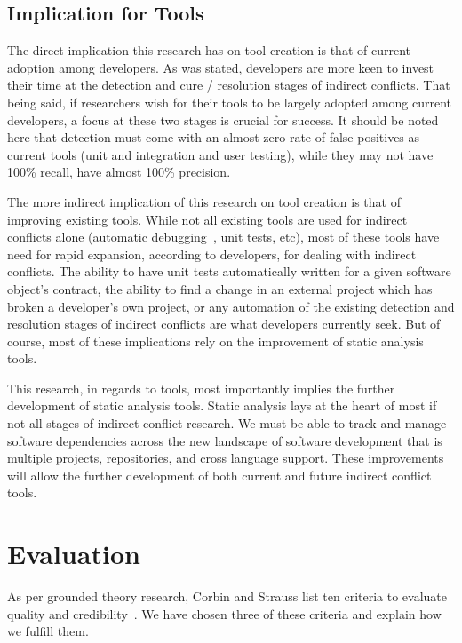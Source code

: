 \documentclass[conference]{IEEEtran}
\begin{document}
\subsection{Implication for Tools}
\label{sec:implt}

The direct implication this research has on tool creation is that of current adoption among developers. As was stated,
developers are more keen to invest their time at the detection and cure / resolution stages of indirect conflicts. That being 
said, if researchers wish for their tools to be largely adopted among current developers, a focus at these two stages
is crucial for success. It should be noted here that detection must come with an almost zero rate of false positives as
current tools (unit and integration and user testing), while they may not have 100\% recall, have almost 100\% precision.

The more indirect implication of this research on tool creation is that of improving existing tools. While not all existing
tools are used for indirect conflicts alone (automatic debugging~\cite{Zeller:2005:WPF}, unit tests, etc), most of these tools
have need for rapid expansion, according to developers, for dealing with indirect conflicts. The ability to have unit tests
automatically written for a given software object's contract, the ability to find a change  in an external project
which has broken a developer's own project, or any automation of the existing detection and resolution stages of indirect
conflicts are what developers currently seek. But of course, most of these implications rely on the improvement of 
static analysis tools.

This research, in regards to tools, most importantly implies the further development of static analysis tools. Static 
analysis lays at the heart of most if not all stages of indirect conflict research. We must be able to track and manage
software dependencies across the new landscape of software development that is multiple projects, repositories, and cross
language support. These improvements will allow the further development of both current and future indirect conflict
tools.

\section{Evaluation}
\label{sec:eval}

As per grounded theory research, Corbin and Strauss list ten criteria to evaluate quality and credibility~\cite{Corbin:1998:SP}.
We have chosen three of these criteria and explain how we fulfill them.
\end{document}
